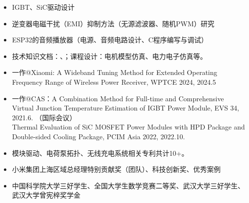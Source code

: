\documentclass[zh]{resume}
\begin{document}
\begin{competences}

    
\end{competences}


\begin{itemize}
  \item IGBT、SiC驱动设计
  \item 逆变器电磁干扰（EMI）抑制方法（无源滤波器、随机PWM）研究
  \item ESP32的音频播放器（电源、音频电路设计、C程序编写与调试）
  \item 技术知识文档：、；课程设计：电机模型仿真、电力电子仿真等。
\end{itemize}


\begin{itemize}
  \item {\small 一作@Xiaomi: A Wideband Tuning Method for Extended Operating Frequency Range of Wireless Power Receiver, WPTCE 2024, 2024.5}
  \item 一作@CAS：{\small A Combination Method for Full-time and Comprehensive Virtual Junction Temperature Estimation of IGBT Power Module, EVS 34, 2021.6. （国际会议）}\\ 
  {\small Thermal Evaluation of SiC MOSFET Power Modules with HPD Package and Double-sided Cooling Package, PCIM Asia 2022, 2022.10.}
  \item 模块驱动、电荷泵拓扑、无线充电系统相关专利共计10+。
\end{itemize}



\begin{itemize}
  \item 小米集团上海区域总经理特别贡献奖（团队）、科技创新奖、优秀案例
  \item 中国科学院大学三好学生、全国大学生数学竞赛二等奖、武汉大学三好学生、武汉大学曾宪梓奖学金
  
\end{itemize}
\end{document}
